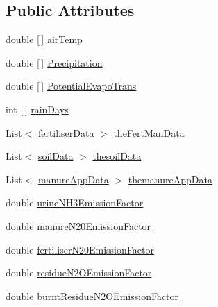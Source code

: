\subsection*{Public Attributes}
\begin{DoxyCompactItemize}
\item 
double \mbox{[}$\,$\mbox{]} \mbox{\hyperlink{struct_global_vars_1_1zone_specific_data_a842b762ca3cab60e23c69ae5762e4238}{air\+Temp}}
\item 
double \mbox{[}$\,$\mbox{]} \mbox{\hyperlink{struct_global_vars_1_1zone_specific_data_a0da46f90b87ee40f79cf10ab32a13b3e}{Precipitation}}
\item 
double \mbox{[}$\,$\mbox{]} \mbox{\hyperlink{struct_global_vars_1_1zone_specific_data_ad5e1f9317fdadcf21c72233bdaa55c44}{Potential\+Evapo\+Trans}}
\item 
int \mbox{[}$\,$\mbox{]} \mbox{\hyperlink{struct_global_vars_1_1zone_specific_data_afdd27f24fc6670d9cb73de94032b9a76}{rain\+Days}}
\item 
List$<$ \mbox{\hyperlink{struct_global_vars_1_1zone_specific_data_1_1fertiliser_data}{fertiliser\+Data}} $>$ \mbox{\hyperlink{struct_global_vars_1_1zone_specific_data_a20a172d383f4f095eadd289e1ec9c252}{the\+Fert\+Man\+Data}}
\item 
List$<$ \mbox{\hyperlink{struct_global_vars_1_1zone_specific_data_1_1soil_data}{soil\+Data}} $>$ \mbox{\hyperlink{struct_global_vars_1_1zone_specific_data_ac06e2d69eea9683c4cb0a82f31218316}{thesoil\+Data}}
\item 
List$<$ \mbox{\hyperlink{struct_global_vars_1_1zone_specific_data_1_1manure_app_data}{manure\+App\+Data}} $>$ \mbox{\hyperlink{struct_global_vars_1_1zone_specific_data_a11a646c8c8cb7a040074b86603ac161b}{themanure\+App\+Data}}
\item 
double \mbox{\hyperlink{struct_global_vars_1_1zone_specific_data_a4870c2df3cc671b6122884afad9eafc3}{urine\+N\+H3\+Emission\+Factor}}
\item 
double \mbox{\hyperlink{struct_global_vars_1_1zone_specific_data_a812236e50824d11600d2bd5660728aa2}{manure\+N20\+Emission\+Factor}}
\item 
double \mbox{\hyperlink{struct_global_vars_1_1zone_specific_data_a9e0f6bbbd02dcfc7316396d328f7e8e3}{fertiliser\+N20\+Emission\+Factor}}
\item 
double \mbox{\hyperlink{struct_global_vars_1_1zone_specific_data_a9a566dcecadda7b3dbb49167a714fbad}{residue\+N2\+O\+Emission\+Factor}}
\item 
double \mbox{\hyperlink{struct_global_vars_1_1zone_specific_data_ad83bc51003485927d537f646a3d83c26}{burnt\+Residue\+N2\+O\+Emission\+Factor}}

\end{DoxyCompactItemize}
